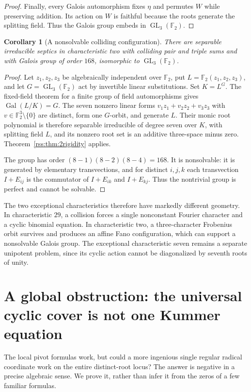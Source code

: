 \documentclass[11pt,a4paper]{article}
\newtheorem{corollary}[theorem]{Corollary}
\theoremstyle{definition}
\theoremstyle{remark}
\newcommand{\F}{\mathbb F}
\newcommand{\Gal}{\operatorname{Gal}}
\begin{document}
\begin{proof}
Finally, every Galois automorphism fixes $\eta$ and permutes $W$ while
preserving addition. Its action on $W$ is faithful because the roots
generate the splitting field. Thus the Galois group embeds in
$\operatorname{GL}_3(\F_2)$.
\end{proof}

\begin{corollary}[A nonsolvable colliding configuration]
There are separable irreducible septics in characteristic two with
colliding pair and triple sums and with Galois group of order $168$,
isomorphic to $\operatorname{GL}_3(\F_2)$.
\end{corollary}
\begin{proof}
Let $z_1,z_2,z_3$ be algebraically independent over $\F_2$, put
$L=\F_2(z_1,z_2,z_3)$, and let $G=\operatorname{GL}_3(\F_2)$ act by
invertible linear substitutions. Set $K=L^G$. The fixed-field theorem
for a finite group of field automorphisms gives
$\Gal(L/K)=G$. The seven nonzero linear forms
$v_1z_1+v_2z_2+v_3z_3$ with $v\in\F_2^3\setminus\{0\}$ are distinct,
form one $G$-orbit, and generate $L$. Their monic root polynomial is
therefore separable irreducible of degree seven over $K$, with splitting
field $L$, and its nonzero root set is an additive three-space minus zero.
Theorem~\ref{rss:thm:2rigidity} applies.

The group has order $(8-1)(8-2)(8-4)=168$. It is nonsolvable: it is
generated by elementary transvections, and for distinct $i,j,k$ each
transvection $I+E_{ij}$ is the commutator of $I+E_{ik}$ and $I+E_{kj}$.
Thus the nontrivial group is perfect and cannot be solvable.
\end{proof}

The two exceptional characteristics therefore have markedly different
geometry. In characteristic $29$, a collision forces a single
nonconstant Fourier character and a cyclic binomial equation. In
characteristic two, a three-character Frobenius orbit survives and produces
an affine Fano configuration, which can support a nonsolvable Galois group.
The exceptional characteristic seven remains a separate unipotent problem,
since its cyclic action cannot be diagonalized by seventh roots of unity.

\section{A global obstruction: the universal cyclic cover is not one Kummer equation}
\label{rss:sec:global}

The local pivot formulas work, but could a more ingenious single regular
radical coordinate work on the entire distinct-root locus? The answer is
negative in a precise algebraic sense. We prove it, rather than infer it
from the zeros of a few familiar formulas.
\end{document}
